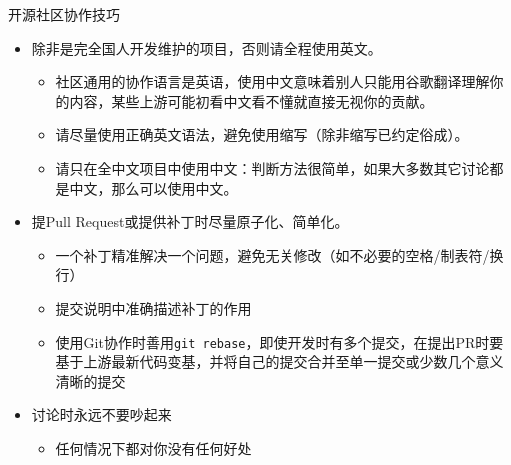 
\begin{frame}{开源社区协作技巧}
	\begin{itemize}
		\item 除非是完全国人开发维护的项目，否则请全程使用英文。
		\begin{itemize}
		    \item 社区通用的协作语言是英语，使用中文意味着别人只能用谷歌翻译理解你的内容，某些上游可能初看中文看不懂就直接无视你的贡献。
		    \item 请尽量使用正确英文语法，避免使用缩写（除非缩写已约定俗成）。
		    \item 请只在全中文项目中使用中文：判断方法很简单，如果大多数其它讨论都是中文，那么可以使用中文。
		\end{itemize}
	    \item 提Pull Request或提供补丁时尽量原子化、简单化。
	    \begin{itemize}
	    	\item 一个补丁精准解决一个问题，避免无关修改（如不必要的空格/制表符/换行）
	    	\item 提交说明中准确描述补丁的作用
	    	\item 使用Git协作时善用\texttt{git rebase}，即使开发时有多个提交，在提出PR时要基于上游最新代码变基，并将自己的提交合并至单一提交或少数几个意义清晰的提交
	    \end{itemize}
        \item 讨论时永远不要吵起来
        \begin{itemize}
        	\item 任何情况下都对你没有任何好处
        \end{itemize}
	\end{itemize}	
\end{frame}

